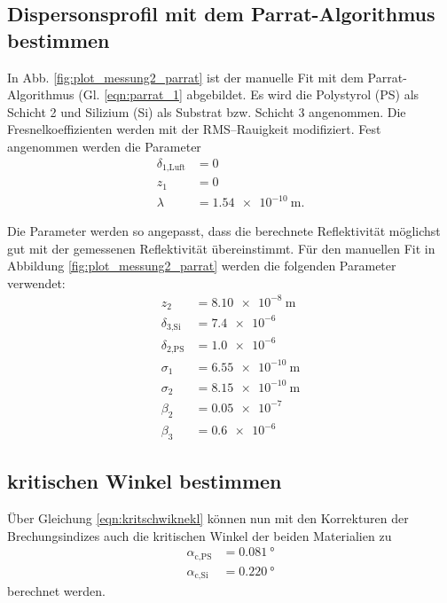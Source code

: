 \subsection{Dispersonsprofil mit dem Parrat-Algorithmus bestimmen} %

In Abb. \ref{fig:plot_messung2_parrat} ist der manuelle Fit mit dem
Parrat-Algorithmus (Gl. \eqref{eqn:parrat_1} abgebildet.
Es wird die Polystyrol (PS) als Schicht 2 und Silizium
(Si) als Substrat bzw. Schicht 3 angenommen.
Die Fresnelkoeffizienten werden mit der RMS–Rauigkeit modifiziert.
Fest angenommen werden die Parameter
 \begin{align*}
  \delta_\text{1,Luft} &= 0 \\
  z_1 &= 0 \\
  \lambda &= \SI{1.54e-10}{\meter}.
\end{align*}

Die Parameter werden so angepasst, dass die berechnete Reflektivität möglichst 
gut mit der gemessenen Reflektivität übereinstimmt.
Für den manuellen Fit in Abbildung \ref{fig:plot_messung2_parrat} werden die folgenden 
Parameter verwendet:
\begin{align*}
  z_2 &= \SI{8.10e-8}{\meter}\\
  \delta_\text{3,Si} &= \num{7.4e-6}\\
  \delta_\text{2,PS} &= \num{1.0e-6}\\
  \sigma_1 &= \SI{6.55e-10}{\meter} \\
  \sigma_2 &= \SI{8.15e-10}{\meter} \\
  \beta_2 &= \num{0.05e-7}\\
  \beta_3 &= \num{0.6e-6}
\end{align*}


\subsection{kritischen Winkel bestimmen}
Über Gleichung \eqref{eqn:kritschwiknekl} können nun mit den Korrekturen der Brechungsindizes auch die kritischen Winkel der beiden Materialien zu 
\begin{align*}
    \alpha_\text{c,PS} &= \SI{0.081}{\degree} \\
    \alpha_\text{c,Si} &= \SI{0.220}{\degree}
\end{align*}
berechnet werden.




